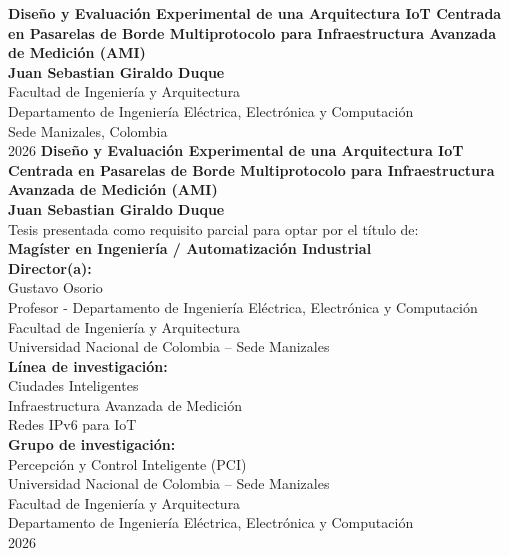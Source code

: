 \documentclass[10pt,spanish,fleqn,openany,twoside,letterpaper]{book}
\newcommand{\studentname}{}
\newcommand{\academictitle}{}
\newcommand{\resgroupone}{}
\newcommand{\researchtopic}{}
\newcommand{\thesisname}{}
\newcommand{\director}{}
\newcommand{\directortitle}{}
\newcommand{\issuedate}{}
\newcommand{\sede}{}
\newcommand{\department}{}
\newcommand{\faculty}{}
\newcommand{\university}{Universidad Nacional de Colombia}
\renewcommand{\studentname}{Juan Sebastian Giraldo Duque}
\renewcommand{\thesisname}{Diseño y Evaluación Experimental de una Arquitectura IoT Centrada en Pasarelas de Borde Multiprotocolo para Infraestructura Avanzada de Medición (AMI)}
\renewcommand{\issuedate}{2026}
\renewcommand{\director}{Gustavo Osorio}
\renewcommand{\directortitle}{Profesor - Departamento de Ingeniería Eléctrica, Electrónica y Computación}
\renewcommand{\academictitle}{Magíster en Ingeniería / Automatización Industrial}
\renewcommand{\resgroupone}{Percepción y Control Inteligente (PCI)}
\renewcommand{\researchtopic}{Ciudades Inteligentes \\ Infraestructura Avanzada de Medición \\ Redes IPv6 para IoT}
\renewcommand{\sede}{Sede Manizales}
\renewcommand{\department}{Departamento de Ingeniería Eléctrica, Electrónica y Computación}
\renewcommand{\faculty}{Facultad de Ingeniería y Arquitectura}
\begin{document}
\renewcommand{\listfigurename}{\sffamily Lista de figuras}
\renewcommand{\listtablename}{\sffamily Lista de tablas}
\renewcommand{\contentsname}{\sffamily Contenido}
\renewcommand{\chaptername}{\sffamily Capítulo}
\renewcommand{\tablename}{\scriptsize \centering \textbf{Tabla}}
\renewcommand{\figurename}{\scriptsize \centering \textbf{Figura}}
\renewcommand{\appendixname}{\sffamily Anexo}

\renewcommand{\bibname}{\sffamily Referencias Bibliográficas}

{\newpage
\thispagestyle{empty}
\begin{center}
\begin{figure}
\centering
{}%
\end{figure}
\vspace{2.5cm}
\textbf{\LARGE \thesisname} \\ 
\vspace{2.5cm}
\textbf{\Large \studentname} \\
\vspace{5.0cm}
\faculty \\ \department \\
\sede, Colombia\\
\issuedate
\newpage 
\thispagestyle{empty}
\vspace{2.0cm}
\textbf{\huge \thesisname} \\
\vspace{2.0cm}
\textbf{\Large \studentname} \\
\vspace{2.0cm}
\small Tesis presentada como requisito parcial para optar por el título de: \\
{\bfseries \academictitle}\\
\vspace{2.0cm}
\textbf{Director(a):} \\
\director \\
\directortitle \\
\faculty \\
\university{} -- \sede
\vspace{1.5cm} \\
\textbf{Línea de investigación:} \\ 
\researchtopic\\
\textbf{Grupo de investigación:} \\
\resgroupone \\
\vspace{1.5cm} 
\university{} -- \sede \\
\faculty \\
\department \\
\issuedate
\end{center}

}
\end{document}
